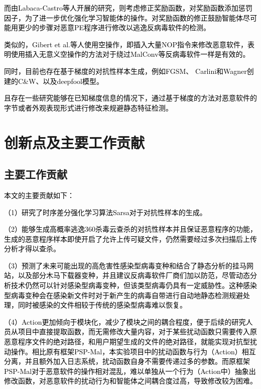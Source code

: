 \textcolor{black}{而由Labaca-Castro等人开展的研究\cite{ref16}，则考虑修正奖励函数，对奖励函数添加惩罚因子，为了进一步优化强化学习智能体的操作。对奖励函数的修正鼓励智能体尽可能用更少的步骤对恶意PE程序进行修改以逃逸反病毒软件的检测。}

\textcolor{black}{类似的，Gibert et al.等人使用空操作\cite{ref17}，即插入大量NOP指令来修改恶意软件，表明使用插入无意义空操作的方法对于绕过MalConv等反病毒软件一样是有效的。}

\textcolor{black}{同时，目前也存在基于梯度的对抗性样本生成，例如FGSM、 Carlini和Wagner创建的C\&W、以及deepfool模型\cite{ref18}\cite{ref19}\cite{ref20}。}

\textcolor{black}{且存在一些研究\cite{ref21}\cite{ref22}\cite{ref23}\cite{ref24}\cite{ref25}\cite{ref26}能够在已知梯度信息的情况下，通过基于梯度的方法对恶意软件的字节或者外观表现形式进行修改来规避静态特征检测。}

\section{创新点及主要工作贡献}
\subsection{主要工作贡献}

\textcolor{black}{本文的主要贡献如下：}

\textcolor{black}{（1）研究了时序差分强化学习算法Sarsa对于对抗性样本的生成。}

\textcolor{black}{（2）能够生成高概率逃逸360杀毒云查杀的对抗性样本并且保证恶意程序的功能，生成的恶意程序样本即使开启了允许上传可疑文件，仍然需要经过多次扫描后上传分析才得以查杀。}

\textcolor{black}{（3）预测了未来可能出现的高危害性感染型病毒变种和结合了静态分析的挂马网站，以及部分木马下载器变种，并且建议反病毒软件厂商们加以防范，尽管动态分析技术仍然可以针对感染型病毒变种，但该类型病毒仍具有一定威胁性。这种感染型病毒变种会在感染新文件时对于新产生的病毒自带进行自动地静态检测规避处理，同时被感染的文件相较于传统的感染型病毒难以恢复。}

\textcolor{black}{（4）Action更加倾向于模块化，减少了模块之间的耦合程度，便于后续的研究人员从项目中直接提取函数，而无需修改大量内容，对于某些扰动函数只需要传入原恶意程序文件的绝对路径，和用户期望生成的文件的绝对路径，就能实现对抗型扰动操作。相比原有框架PSP-Mal\cite{ref12}，本实验项目中的扰动函数与行为（Action）相互分离，并且额外加入日志系统，扰动函数自身不需要传递过多的参数。而原框架PSP-Mal对于恶意软件的操作相对混乱，难以单独从一个行为（Action中）抽象出修改函数，对恶意软件的扰动行为和智能体之间耦合度过高，导致修改较为困难。}

